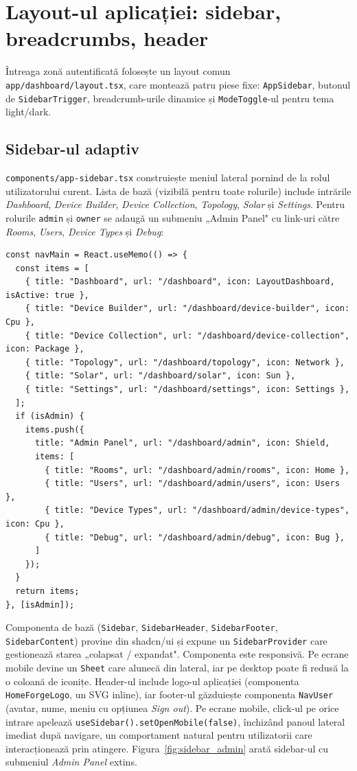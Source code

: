 \section{Layout-ul aplicației: sidebar, breadcrumbs, header}
Întreaga zonă autentificată folosește un layout comun \texttt{app/dashboard/layout.tsx}, care montează patru piese fixe: \texttt{AppSidebar}, butonul de \texttt{SidebarTrigger}, breadcrumb-urile dinamice și \texttt{ModeToggle}-ul pentru tema light/dark.

\subsection{Sidebar-ul adaptiv}
\texttt{components/app-sidebar.tsx} construiește meniul lateral pornind de la rolul utilizatorului curent. Lista de bază (vizibilă pentru toate rolurile) include intrările \emph{Dashboard}, \emph{Device Builder}, \emph{Device Collection}, \emph{Topology}, \emph{Solar} și \emph{Settings}. Pentru rolurile \texttt{admin} și \texttt{owner} se adaugă un submeniu „Admin Panel" cu link-uri către \emph{Rooms}, \emph{Users}, \emph{Device Types} și \emph{Debug}:
\begin{verbatim}
const navMain = React.useMemo(() => {
  const items = [
    { title: "Dashboard", url: "/dashboard", icon: LayoutDashboard, isActive: true },
    { title: "Device Builder", url: "/dashboard/device-builder", icon: Cpu },
    { title: "Device Collection", url: "/dashboard/device-collection", icon: Package },
    { title: "Topology", url: "/dashboard/topology", icon: Network },
    { title: "Solar", url: "/dashboard/solar", icon: Sun },
    { title: "Settings", url: "/dashboard/settings", icon: Settings },
  ];
  if (isAdmin) {
    items.push({
      title: "Admin Panel", url: "/dashboard/admin", icon: Shield,
      items: [
        { title: "Rooms", url: "/dashboard/admin/rooms", icon: Home },
        { title: "Users", url: "/dashboard/admin/users", icon: Users },
        { title: "Device Types", url: "/dashboard/admin/device-types", icon: Cpu },
        { title: "Debug", url: "/dashboard/admin/debug", icon: Bug },
      ]
    });
  }
  return items;
}, [isAdmin]);
\end{verbatim}

Componenta de bază (\texttt{Sidebar}, \texttt{SidebarHeader}, \texttt{SidebarFooter}, \texttt{SidebarContent}) provine din shadcn/ui și expune un \texttt{SidebarProvider} care gestionează starea „colapsat / expandat". Componenta este responsivă. Pe ecrane mobile devine un \texttt{Sheet} care alunecă din lateral, iar pe desktop poate fi redusă la o coloană de iconițe. Header-ul include logo-ul aplicației (componenta \texttt{HomeForgeLogo}, un SVG inline), iar footer-ul găzduiește componenta \texttt{NavUser} (avatar, nume, meniu cu opțiunea \emph{Sign out}). Pe ecrane mobile, click-ul pe orice intrare apelează \texttt{useSidebar().setOpenMobile(false)}, închizând panoul lateral imediat după navigare, un comportament natural pentru utilizatorii care interacționează prin atingere. Figura~\ref{fig:sidebar_admin} arată sidebar-ul cu submeniul \emph{Admin Panel} extins.

